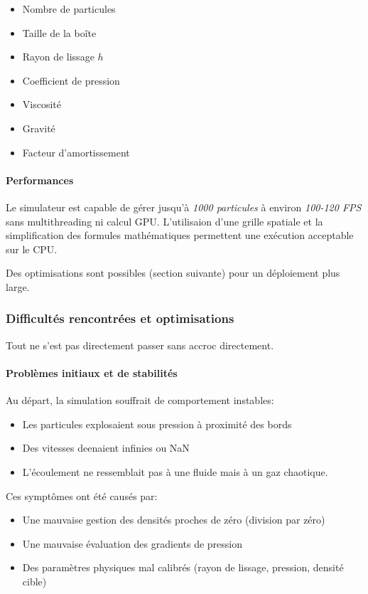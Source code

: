 \documentclass{article}
\begin{document}
\begin{itemize}
    \item Nombre de particules
    \item Taille de la boîte 
    \item Rayon de lissage \(h\)
    \item Coefficient de pression
    \item Viscosité
    \item Gravité
    \item Facteur d'amortissement
\end{itemize}

\paragraph{Performances}

Le simulateur est capable de gérer jusqu'à {\emph {1000 particules}} à environ {\emph {100-120 FPS}} sans multithreading ni calcul GPU. L'utilisaion d'une grille spatiale et la simplification des formules mathématiques permettent une exécution acceptable sur le CPU.

Des optimisations sont possibles (section suivante) pour un déploiement plus large.

\subsubsection{Difficultés rencontrées et optimisations}

Tout ne s'est pas directement passer sans accroc directement.

\paragraph{Problèmes initiaux et de stabilités}

Au départ, la simulation souffrait de comportement instables:

\begin{itemize}
    \item Les particules explosaient sous pression à proximité des bords
    \item Des vitesses deenaient infinies ou NaN
    \item L'écoulement ne ressemblait pas à une fluide mais à un gaz chaotique.
\end{itemize}

Ces symptômes ont été causés par:

\begin{itemize}
    \item Une mauvaise gestion des densités proches de zéro (division par zéro)
    \item Une mauvaise évaluation des gradients de pression
    \item Des paramètres physiques mal calibrés (rayon de lissage, pression, densité cible)
\end{itemize}
\end{document}
